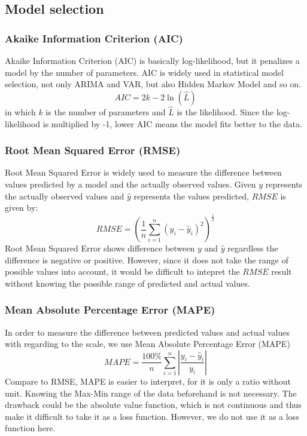 \documentclass[11pt]{article}
\begin{document}
\subsection{Model selection}
\subsubsection{Akaike Information Criterion (AIC)}
Akaike Information Criterion (AIC) is basically log-likelihood, but it penalizes
a model by the number of parameters. AIC is widely used in statistical model
selection, not only ARIMA and VAR, but also Hidden Markov Model and so on.
$$
AIC = 2k -2\ln(\hat{L})
$$
in which $k$ is the number of parameters and $\hat{L}$ is the likelihood. Since
the log-likelihood is multiplied by -1, lower AIC means the model fits better to
the data.

\subsubsection{Root Mean Squared Error (RMSE)}
Root Mean Squared Error is widely used to measure the difference between values
predicted by a model and the actually observed values. Given $y$ represents the
actually observed values and $\hat{y}$ represents the values predicted, $RMSE$
is given by:
$$
RMSE = \left( \frac{1}{n}\sum _{i=1}^{n}(y_i -\hat{y}_i)^2 \right)^\frac{1}{2}
$$
Root Mean Squared Error shows difference between $y$ and $\hat{y}$ regardless
the difference is negative or positive. However, since it does not take the
range of possible values into account, it would be difficult to intepret the
$RMSE$ result without knowing the possible range of predicted and actual values.

\subsubsection{Mean Absolute Percentage Error (MAPE)}
In order to measure the difference between predicted values and actual values
with regarding to the scale, we use Mean Absolute Percentage Error (MAPE)
$$
MAPE = \frac{100\%}{n}\sum  _{i=1}^{n}\left| \frac{y_i -\hat{y}_i}{y_i} \right|
$$
Compare to RMSE, MAPE is easier to interpret, for it is only a ratio without
unit. Knowing the Max-Min range of the data beforehand is not necessary. The
drawback could be the absolute value function, which is not continuous and thus
make it difficult to take it as a loss function. However, we do not use it as a
loss function here.
\end{document}
